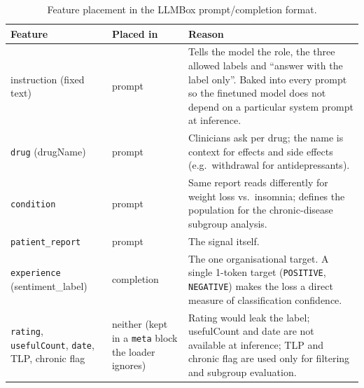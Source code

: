 \documentclass[11pt]{article}
\newcommand{\code}[1]{\texttt{#1}}
\begin{document}
\begin{table}[H]\centering\small
\begin{tabular}{p{2.6cm}p{1.6cm}p{10.6cm}}\toprule
Feature & Placed in & Reason \\\midrule
instruction (fixed text) & prompt & Tells the model the role, the three allowed labels and ``answer with the label only''. Baked into every prompt so the finetuned model does not depend on a particular system prompt at inference. \\
\code{drug} (drugName) & prompt & Clinicians ask per drug; the name is context for effects and side effects (e.g.\ withdrawal for antidepressants). \\
\code{condition} & prompt & Same report reads differently for weight loss vs.\ insomnia; defines the population for the chronic-disease subgroup analysis. \\
\code{patient\_report} & prompt & The signal itself. \\
\code{experience} (sentiment\_label) & completion & The one organisational target. A single 1-token target (\code{POSITIVE}, \code{NEGATIVE}) makes the loss a direct measure of classification confidence. \\
\code{rating}, \code{usefulCount}, \code{date}, TLP, chronic flag & neither (kept in a \code{meta} block the loader ignores) & Rating would leak the label; usefulCount and date are not available at inference; TLP and chronic flag are used only for filtering and subgroup evaluation. \\
\bottomrule\end{tabular}
\caption{Feature placement in the LLMBox prompt/completion format.}\label{tab:features}
\end{table}
\end{document}
